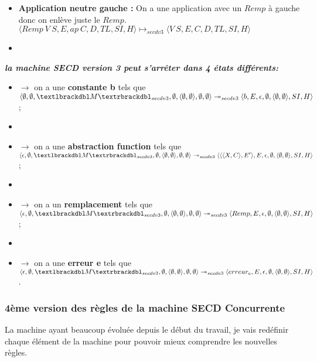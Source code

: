 \documentclass[10pt,a4paper]{article}
\begin{document}
\begin{itemize}
\begin{itemize}
						\item[] \textbf{Application neutre gauche :} On a une application avec un $Remp$ à gauche donc on enlève juste le $Remp$.
						\smallbreak
						$\langle Remp~V~S,E,ap~C,D,TL,SI,H\rangle \longmapsto_{secdv3} \langle V~S,E,C,D,TL,SI,H\rangle$
						\item[]
					\end{itemize}
				\end{itemize}
				\bigbreak
				\bigbreak
				
				\textbf{\textit{la machine SECD version 3 peut s'arrêter dans 4 états différents:}}
				\smallbreak
				\begin{itemize}
					\item[]$\longrightarrow$ on a une \textbf{constante b} tels que $\langle \emptyset,\emptyset,\textlbrackdbl M\textrbrackdbl_{secdv3},\emptyset,\langle\emptyset,\emptyset\rangle,\emptyset,\emptyset\rangle \twoheadrightarrow_{secdv3} \langle b,E,\epsilon,\emptyset,\langle\emptyset,\emptyset\rangle,SI,H\rangle$;
					\item[]
					\item[]$\longrightarrow$ on a une \textbf{abstraction function} tels que $\langle \epsilon,\emptyset,\textlbrackdbl M\textrbrackdbl_{secdv3},\emptyset,\langle\emptyset,\emptyset\rangle,\emptyset,\emptyset\rangle \twoheadrightarrow_{secdv3} \langle\langle\langle X,C\rangle,E'\rangle,E,\epsilon,\emptyset,\langle\emptyset,\emptyset\rangle,SI,H\rangle$;
					\item[]
					\item[]$\longrightarrow$ on a un \textbf{remplacement} tels que $\langle \epsilon,\emptyset,\textlbrackdbl M\textrbrackdbl_{secdv3},\emptyset,\langle\emptyset,\emptyset\rangle,\emptyset,\emptyset\rangle \twoheadrightarrow_{secdv3} \langle Remp,E,\epsilon,\emptyset,\langle\emptyset,\emptyset\rangle,SI,H\rangle$;
					\item[]
					\item[]$\longrightarrow$ on a une \textbf{erreur e} tels que $\langle \epsilon,\emptyset,\textlbrackdbl M\textrbrackdbl_{secdv3},\emptyset,\langle\emptyset,\emptyset\rangle,\emptyset,\emptyset\rangle \twoheadrightarrow_{secdv3} \langle erreur_{e},E,\epsilon,\emptyset,\langle\emptyset,\emptyset\rangle,SI,H\rangle$.
				\end{itemize}
				\newpage
				
				
				
			\subsubsection{4ème version des règles de la machine SECD Concurrente}
				La machine ayant beaucoup évoluée depuis le début du travail, je vais redéfinir chaque élément de la machine pour pouvoir mieux comprendre les nouvelles règles.
				\bigbreak
				
\end{document}

